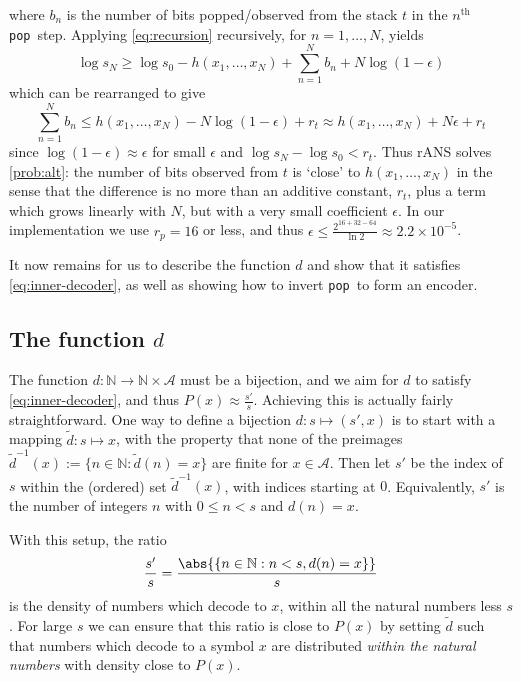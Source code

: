 \documentclass{article}
\newcommand{\pop}{\texttt{pop}}
\begin{document}
where \(b_n\) is the number of bits popped/observed from the stack \(t\) in the
\(n^{\mathrm{th}}\) \pop\ step. Applying \cref{eq:recursion} recursively, for
\(n=1,\ldots, N\), yields
\begin{equation}
  \log s_N \geq \log s_0 - h(x_1, \ldots, x_N) + \sum_{n=1}^{N} b_n +
  N\log(1-\epsilon)
\end{equation}
which can be rearranged to give
\begin{equation}
  \sum_{n=1}^Nb_n \leq h(x_1, \ldots, x_N) - N\log(1-\epsilon) + r_t
  \approx h(x_1, \ldots, x_N) + N\epsilon + r_t
\end{equation}
since \(\log(1 - \epsilon)\approx\epsilon\) for small \(\epsilon\) and \(\log
s_N - \log s_0 < r_t\). Thus rANS solves \cref{prob:alt}: the number of bits
observed from \(t\) is `close' to \(h(x_1,\ldots,x_N)\) in the sense that the
difference is no more than an additive constant, \(r_t\), plus a term which
grows linearly with \(N\), but with a very small coefficient \(\epsilon\). In
our implementation we use \(r_p = 16\) or less, and thus \(\epsilon \leq
\frac{2^{16 + 32 - 64}}{\ln 2} \approx 2.2\times 10^{-5}\).

It now remains for us to describe the function \(d\) and show that it satisfies
\cref{eq:inner-decoder}, as well as showing how to invert \pop\ to form an
encoder.

\subsection{The function \(d\)}
The function \(d:\mathbb{N}\rightarrow\mathbb{N}\times\mathcal{A}\) must be a
bijection, and we aim for \(d\) to satisfy \cref{eq:inner-decoder}, and thus
\(P(x)\approx \frac{s'}{s}\).  Achieving this is actually fairly
straightforward.  One way to define a bijection \(d:s\mapsto(s', x)\) is to
start with a mapping \(\tilde d: s\mapsto x\), with the property that none of
the preimages \(\tilde d^{-1}(x):=\{n\in\mathbb{N}:\tilde d(n) = x\}\) are
finite for \(x\in\mathcal{A}\). Then let \(s'\) be the index of \(s\) within
the (ordered) set \(\tilde d^{-1}(x)\), with indices starting at \(0\).
Equivalently, \(s'\) is the number of integers \(n\) with \(0\leq n<s\) and
\(d(n) = x\).

With this setup, the ratio
\begin{equation}\label{eq:ratio}
  \frac{s'}{s} = \frac{\abs{\{n\in\mathbb{N}: n < s, d(n) = x\}}}{s}
\end{equation}
is the density of numbers which decode to \(x\), within all the natural numbers
less \(s\). For large \(s\) we can ensure that this ratio is close to \(P(x)\)
by setting \(\tilde d\) such that numbers which decode to a symbol \(x\) are
distributed \emph{within the natural numbers} with density close to \(P(x)\).
\end{document}
